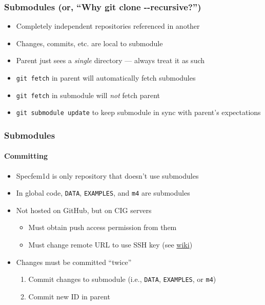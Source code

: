 \begin{frame}
 \frametitle{Submodules (or, ``Why git clone -{}-recursive?'')}

 \begin{itemize}
  \item Completely \alert{independent} repositories referenced in another
  \item Changes, commits, etc.{} are local to submodule
  \item Parent just sees a \textit{single} directory --- always treat it as such
  \item \texttt{git fetch} in parent will automatically fetch submodules
  \item \texttt{git fetch} in submodule will \textit{not} fetch parent
  \item \texttt{git submodule update} to keep submodule in sync with parent's
        expectations
 \end{itemize}
\end{frame}

\begin{frame}
 \frametitle{Submodules}
 \framesubtitle{Committing}

 \begin{itemize}
  \item Specfem1d is only repository that doesn't use submodules
  \item In global code, \texttt{DATA}, \texttt{EXAMPLES}, and \texttt{m4} are
        submodules
  \item Not hosted on GitHub, but on CIG servers
   \begin{itemize}
    \item Must obtain push access permission from them
    \item Must change remote URL to use SSH key (see
\href{https://github.com/geodynamics/specfem3d/wiki/Git-tips-for-developers%
\#modifying-the-examples}{wiki})
   \end{itemize}
  \item Changes must be committed ``twice''
   \begin{enumerate}
    \item Commit changes to submodule (i.e., \texttt{DATA}, \texttt{EXAMPLES},
          or \texttt{m4})
    \item Commit new ID in parent
   \end{enumerate}
 \end{itemize}
\end{frame}
